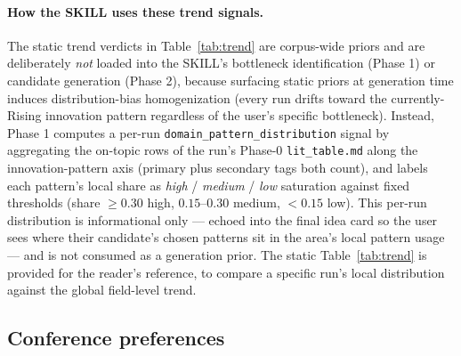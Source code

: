 \documentclass[10pt,a4paper]{article}
\begin{document}
\paragraph{How the SKILL uses these trend signals.} The static trend verdicts in Table~\ref{tab:trend} are corpus-wide priors and are deliberately \emph{not} loaded into the SKILL's bottleneck identification (Phase 1) or candidate generation (Phase 2), because surfacing static priors at generation time induces distribution-bias homogenization (every run drifts toward the currently-Rising innovation pattern regardless of the user's specific bottleneck). Instead, Phase 1 computes a per-run \texttt{domain\_pattern\_distribution} signal by aggregating the on-topic rows of the run's Phase-0 \texttt{lit\_table.md} along the innovation-pattern axis (primary plus secondary tags both count), and labels each pattern's local share as \emph{high} / \emph{medium} / \emph{low} saturation against fixed thresholds (share $\geq 0.30$ high, $0.15$--$0.30$ medium, $<0.15$ low). This per-run distribution is informational only --- echoed into the final idea card so the user sees where their candidate's chosen patterns sit in the area's local pattern usage --- and is not consumed as a generation prior. The static Table~\ref{tab:trend} is provided for the reader's reference, to compare a specific run's local distribution against the global field-level trend.

\subsection{Conference preferences}
\end{document}
